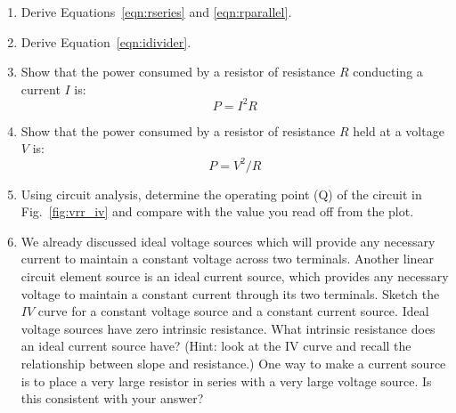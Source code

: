 \begin{enumerate}

\item Derive Equations~\ref{eqn:rseries} and \ref{eqn:rparallel}.

\item Derive Equation~\ref{eqn:idivider}.

\item Show that the power consumed by a resistor of resistance $R$ conducting a current $I$ is:
\begin{displaymath}
P = I^2R
\end{displaymath}

\item Show that the power consumed by a resistor of resistance $R$ held at a voltage $V$ is:
\begin{displaymath}
P = V^2/R
\end{displaymath}

\item Using circuit analysis, determine the operating point (Q) of the
  circuit in Fig.~\ref{fig:vrr_iv} and compare with the value you read
  off from the plot.



\item We already discussed ideal voltage sources which will provide
  any necessary current to maintain a constant voltage across two
  terminals.  Another linear circuit element source is an ideal
  current source, which provides any necessary voltage to maintain a
  constant current through its two terminals.  Sketch the $IV$ curve
  for a constant voltage source and a constant current source.  Ideal
  voltage sources have zero intrinsic resistance.  What intrinsic
  resistance does an ideal current source have?  (Hint: look at the IV
  curve and recall the relationship between slope and resistance.)
  One way to make a current source is to place a very large resistor
  in series with a very large voltage source.  Is this consistent with
  your answer?



\end{enumerate}
